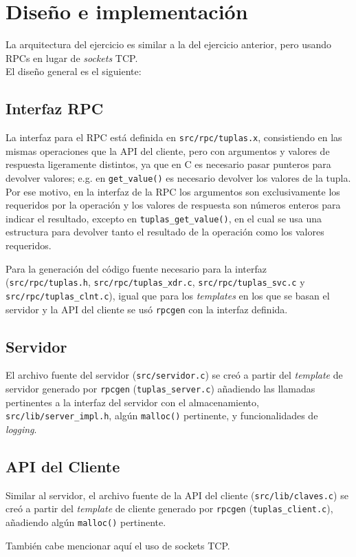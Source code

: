 \section{Diseño e implementación}

La arquitectura del ejercicio es similar a la del ejercicio anterior, pero usando RPCs en lugar de \textit{sockets} TCP.\\
El diseño general es el siguiente:

%     

\subsection{Interfaz RPC}
La interfaz para el RPC está definida en \texttt{src/rpc/tuplas.x}, consistiendo en las mismas operaciones que la API del cliente, pero con argumentos y valores de respuesta ligeramente distintos, ya que en C es necesario pasar punteros para devolver valores; e.g. en \texttt{get\_value()} es necesario devolver los valores de la tupla.\\
Por ese motivo, en la interfaz de la RPC los argumentos son exclusivamente los requeridos por la operación y los valores de respuesta son números enteros para indicar el resultado, excepto en \texttt{tuplas\_get\_value()}, en el cual se usa una estructura para devolver tanto el resultado de la operación como los valores requeridos.\newline

Para la generación del código fuente necesario para la interfaz (\texttt{src/rpc/tuplas.h}, \texttt{src/rpc/tuplas\_xdr.c}, \texttt{src/rpc/tuplas\_svc.c} y \texttt{src/rpc/tuplas\_clnt.c}), igual que para los \textit{templates} en los que se basan el servidor y la API del cliente se usó \texttt{rpcgen} con la interfaz definida.

\subsection{Servidor}
El archivo fuente del servidor (\texttt{src/servidor.c}) se creó a partir del \textit{template} de servidor generado por \texttt{rpcgen} (\texttt{tuplas\_server.c}) añadiendo las llamadas pertinentes a la interfaz del servidor con el almacenamiento, \texttt{src/lib/server\_impl.h}, algún \texttt{malloc()} pertinente, y funcionalidades de \textit{logging}.


\subsection{API del Cliente}
Similar al servidor, el archivo fuente de la API del cliente (\texttt{src/lib/claves.c}) se creó a partir del \textit{template} de cliente generado por \texttt{rpcgen} (\texttt{tuplas\_client.c}), añadiendo  algún \texttt{malloc()} pertinente.\newline

También cabe mencionar aquí el uso de sockets TCP.
